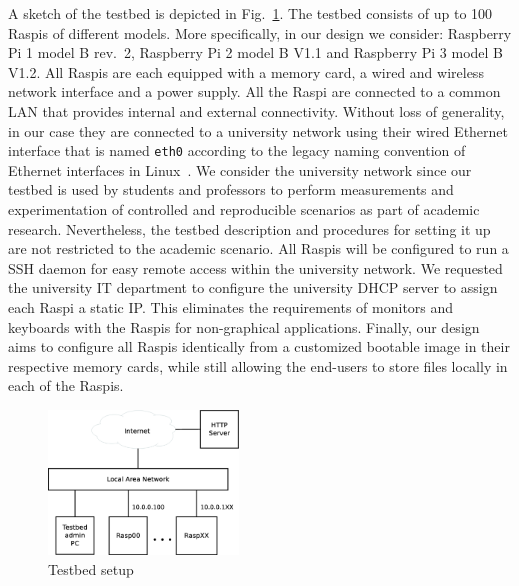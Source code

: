 \label{sec:overview}

A sketch of the testbed is depicted in Fig.~\ref{fig:testbed_setup}.
The testbed consists of up to 100 \ac{Raspi}s of different models.
More specifically, in our design we consider: Raspberry Pi 1 model B rev.~2,
Raspberry Pi 2 model B V1.1 and Raspberry Pi 3 model B V1.2.
All \ac{Raspi}s are each equipped with a memory card, a wired and wireless
network interface and a power supply. All the \ac{Raspi} are connected to
a common \ac{LAN} that provides internal and external connectivity. Without
loss of generality, in our case they are connected to a university network
using their wired Ethernet interface that is named \texttt{eth0} according
to the legacy naming convention of Ethernet interfaces in
Linux~\cite{PredictableNetworkInterfaceNames}. We consider the
university network since our testbed is used by students and
professors to perform measurements and experimentation of controlled and
reproducible scenarios as part of academic research. Nevertheless, the
testbed description and procedures for setting it up are not restricted
to the academic scenario. All \ac{Raspi}s will be configured to run
a \ac{SSH} daemon for easy remote access within the university network.
We requested the university \ac{IT} department to configure the university
\ac{DHCP} server to assign each \ac{Raspi} a static \ac{IP}. This
eliminates the requirements of monitors and keyboards with the \ac{Raspi}s
for non-graphical applications. Finally, our design aims to configure all
\ac{Raspi}s identically from a customized bootable image in their
respective memory cards, while still allowing the end-users to store
files locally in each of the \ac{Raspi}s.

\begin{figure}[ht!]
\centering
\includegraphics[width=0.45\textwidth]{images/testbed_setup3.eps}
\caption{Testbed setup}
\label{fig:testbed_setup}
\end{figure}


